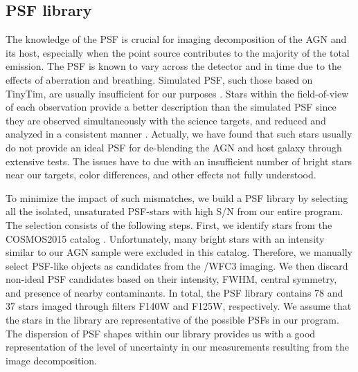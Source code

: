 \documentclass[apj]{emulateapj}
\begin{document}

 
\subsection{PSF library}
\label{sec:psf_library}

The knowledge of the PSF is crucial for imaging decomposition of the AGN and its host, especially when the point source contributes to the majority of the total emission. The PSF is known to vary across the detector and in time due to the effects of aberration and breathing. Simulated PSF, such those based on {\sc TinyTim}, are usually insufficient for our purposes \citep{Mechtley2012}. Stars within the field-of-view of each observation provide a better description than the simulated PSF since they are observed simultaneously with the science targets, and reduced and analyzed in a consistent manner \citet{Kim2008, Park15}. Actually, we have found that such stars usually do not provide an ideal PSF for de-blending the AGN and host galaxy through extensive tests. The issues have to due with an insufficient number of bright stars near our targets, color differences, and other effects not fully understood.

To minimize the impact of such mismatches, we build a PSF library by selecting all the isolated, unsaturated PSF-stars with high S/N from our entire program. The selection consists of the following steps. First, we identify stars from the COSMOS2015 catalog \citep{Laigle2016}. Unfortunately, many bright stars with an intensity similar to our AGN sample were excluded in this catalog. Therefore, we manually select PSF-like objects as candidates from the \hst/WFC3 imaging. We then discard non-ideal PSF candidates based on their intensity, FWHM, central symmetry, and presence of nearby contaminants. In total, the PSF library contains 78 and 37 stars imaged through filters F140W and F125W, respectively. We assume that the stars in the library are representative of the possible PSFs in our program. The dispersion of PSF shapes within our library provides us with a good representation of the level of uncertainty in our measurements resulting from the image decomposition.
\end{document}
